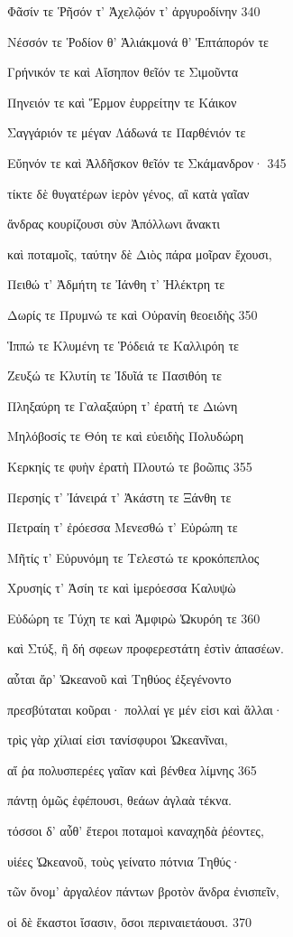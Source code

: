 Φᾶσίν τε Ῥῆσόν τ' Ἀχελῷόν τ' ἀργυροδίνην 340

Νέσσόν τε Ῥοδίον θ' Ἁλιάκμονά θ' Ἑπτάπορόν τε

Γρήνικόν τε καὶ Αἴσηπον θεῖόν τε Σιμοῦντα

Πηνειόν τε καὶ Ἕρμον ἐυρρείτην τε Κάικον

Σαγγάριόν τε μέγαν Λάδωνά τε Παρθένιόν τε

Εὔηνόν τε καὶ Ἀλδῆσκον θεῖόν τε Σκάμανδρον· 345

τίκτε δὲ θυγατέρων ἱερὸν γένος, αἳ κατὰ γαῖαν

ἄνδρας κουρίζουσι σὺν Ἀπόλλωνι ἄνακτι

καὶ ποταμοῖς, ταύτην δὲ Διὸς πάρα μοῖραν ἔχουσι,

Πειθώ τ' Ἀδμήτη τε Ἰάνθη τ' Ἠλέκτρη τε

Δωρίς τε Πρυμνώ τε καὶ Οὐρανίη θεοειδὴς 350

Ἱππώ τε Κλυμένη τε Ῥόδειά τε Καλλιρόη τε

Ζευξώ τε Κλυτίη τε Ἰδυῖά τε Πασιθόη τε

Πληξαύρη τε Γαλαξαύρη τ' ἐρατή τε Διώνη

Μηλόβοσίς τε Θόη τε καὶ εὐειδὴς Πολυδώρη 

Κερκηίς τε φυὴν ἐρατὴ Πλουτώ τε βοῶπις 355

Περσηίς τ' Ἰάνειρά τ' Ἀκάστη τε Ξάνθη τε

Πετραίη τ' ἐρόεσσα Μενεσθώ τ' Εὐρώπη τε

Μῆτίς τ' Εὐρυνόμη τε Τελεστώ τε κροκόπεπλος

Χρυσηίς τ' Ἀσίη τε καὶ ἱμερόεσσα Καλυψὼ

Εὐδώρη τε Τύχη τε καὶ Ἀμφιρὼ Ὠκυρόη τε 360

καὶ Στύξ, ἣ δή σφεων προφερεστάτη ἐστὶν ἁπασέων.

αὗται ἄρ' Ὠκεανοῦ καὶ Τηθύος ἐξεγένοντο

πρεσβύταται κοῦραι· πολλαί γε μέν εἰσι καὶ ἄλλαι·

τρὶς γὰρ χίλιαί εἰσι τανίσφυροι Ὠκεανῖναι,

αἵ ῥα πολυσπερέες γαῖαν καὶ βένθεα λίμνης 365

πάντῃ ὁμῶς ἐφέπουσι, θεάων ἀγλαὰ τέκνα. 

τόσσοι δ' αὖθ' ἕτεροι ποταμοὶ καναχηδὰ ῥέοντες,

υἱέες Ὠκεανοῦ, τοὺς γείνατο πότνια Τηθύς· 

τῶν ὄνομ' ἀργαλέον πάντων βροτὸν ἄνδρα ἐνισπεῖν, 

οἱ δὲ ἕκαστοι ἴσασιν, ὅσοι περιναιετάουσι. 370 

